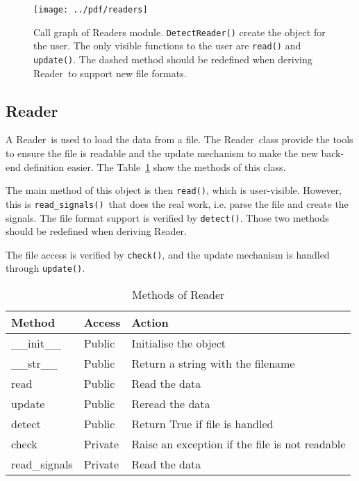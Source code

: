 \documentclass[a4paper,11pt]{article}
\newcommand{\meth}[1]{\texttt{#1()}}
\newcommand{\cls}[1]{\textsf{#1}}
\newcommand{\rd}{\cls{Reader}}
\begin{document}
\begin{figure}[htbp]
  \centering
  \texttt{[image: ../pdf/readers]}
  \caption{Call graph of Readers module. \meth{DetectReader} create the object for the user. The only visible functions to the user are \meth{read} and \meth{update}. The dashed method should be redefined when deriving \rd\ to support new file formats.}
  \label{fig:rds:callgraph}
\end{figure}

\subsection{Reader}
\label{sec:readers:reader}
 
A \rd\ is used to load the data from a file.
The \rd\ class provide the tools to ensure the file is readable and the update mechanism to make the new back-end definition easier.
The Table~\ref{tab:rds:meth} show the methods of this class.

The main method of this object is then \meth{read}, which is user-visible.
However, this is \meth{read\_signals}\ that does the real work, i.e. parse the file and create the signals.
The file format support is verified by \meth{detect}.
Those two methods should be redefined when deriving \rd.

The file access is verified by \meth{check}, and the update mechanism is handled through \meth{update}.

\begin{table}[htbp]
  \centering\sf\small
  \begin{tabular}{lll}
    \hline
    Method & Access & Action \\
    \hline
    \_\_init\_\_ & Public & Initialise the object \\
    \_\_str\_\_  & Public & Return a string with the filename\\
    read         & Public & Read the data\\
    update       & Public & Reread the data\\
    detect       & Public & Return True if file is handled\\
    check        & Private& Raise an exception if the file is not readable\\
    read\_signals    & Private& Read the data \\
    \hline
  \end{tabular}
  \caption{Methods of \rd}
  \label{tab:rds:meth}
\end{table}
\end{document}
